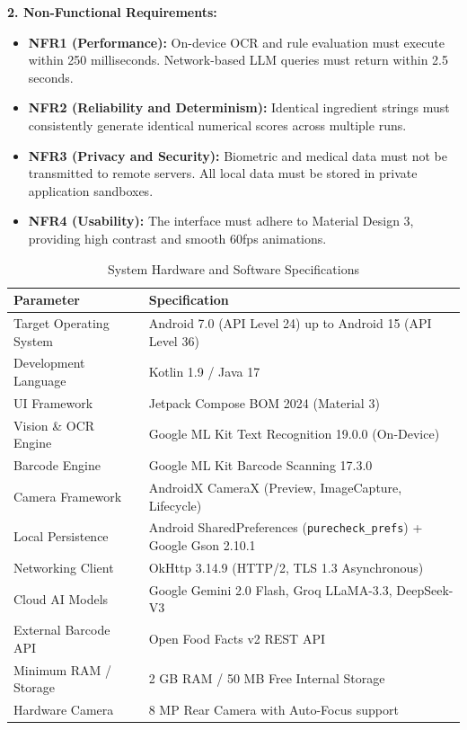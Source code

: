 \documentclass[12pt]{article}
\begin{document}
\vspace{0.3cm}

\noindent
\textbf{2. Non-Functional Requirements:}
\begin{itemize}
    \item \textbf{NFR1 (Performance):} On-device OCR and rule evaluation must execute within 250 milliseconds. Network-based LLM queries must return within 2.5 seconds.
    \item \textbf{NFR2 (Reliability and Determinism):} Identical ingredient strings must consistently generate identical numerical scores across multiple runs.
    \item \textbf{NFR3 (Privacy and Security):} Biometric and medical data must not be transmitted to remote servers. All local data must be stored in private application sandboxes.
    \item \textbf{NFR4 (Usability):} The interface must adhere to Material Design 3, providing high contrast and smooth 60fps animations.
\end{itemize}

\newpage

\begin{table}[h!]
\centering
\caption{System Hardware and Software Specifications}
\vspace{0.3cm}
\begin{tabular}{|l|p{10cm}|}
\hline
\textbf{Parameter} & \textbf{Specification} \\
\hline
Target Operating System & Android 7.0 (API Level 24) up to Android 15 (API Level 36) \\
\hline
Development Language & Kotlin 1.9 / Java 17 \\
\hline
UI Framework & Jetpack Compose BOM 2024 (Material 3) \\
\hline
Vision \& OCR Engine & Google ML Kit Text Recognition 19.0.0 (On-Device) \\
\hline
Barcode Engine & Google ML Kit Barcode Scanning 17.3.0 \\
\hline
Camera Framework & AndroidX CameraX (Preview, ImageCapture, Lifecycle) \\
\hline
Local Persistence & Android SharedPreferences (\texttt{purecheck\_prefs}) + Google Gson 2.10.1 \\
\hline
Networking Client & OkHttp 3.14.9 (HTTP/2, TLS 1.3 Asynchronous) \\
\hline
Cloud AI Models & Google Gemini 2.0 Flash, Groq LLaMA-3.3, DeepSeek-V3 \\
\hline
External Barcode API & Open Food Facts v2 REST API \\
\hline
Minimum RAM / Storage & 2 GB RAM / 50 MB Free Internal Storage \\
\hline
Hardware Camera & 8 MP Rear Camera with Auto-Focus support \\
\hline
\end{tabular}
\end{table}
\end{document}
